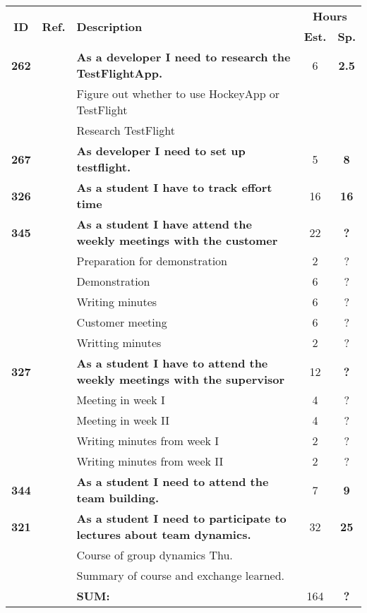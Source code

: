 \label{tab:sprint1storiesProcess}
\def\arraystretch{1.25}
 
\begin{longtable}{ccXcc}

\toprule[0.5mm]
\multirow{2}{*}{\textbf{ID}} &
\multirow{2}{*}{\textbf{Ref.}} & \multirow{2}{*}{\textbf{Description}} & \multicolumn{2}{c}{\textbf{Hours}} \\
 					& & & \textbf{Est.} & \textbf{Sp.} \\
\midrule

\textbf{262} 	&& {\bf As a developer I need to research the TestFlightApp. } 	& 		6	& \textbf{2.5} \\
				&& Figure out whether to use HockeyApp or TestFlight&  &  \\
				&& Research TestFlight	&  &  \\
\textbf{267} 	&& {\bf As developer I need to set up testflight. } 	& 		5	& \textbf{8} \\
\textbf{326} 	& 
	& {\bf  As a student I have to track effort time} 	& 		16	& \textbf{16} \\
\textbf{345} 	& 
	& {\bf As a student I have attend the weekly meetings with the customer} 	
	& 	22	
	& \textbf{?} \\
		&& Preparation for demonstration	& 2 & ? \\
		&& Demonstration	& 6 & ? \\
		&& Writing minutes 	&  6 & ? \\	
		&& Customer meeting	&  6 & ? \\
		&& Writting minutes	&  2 & ? \\
		
\textbf{327} 	& 
	& {\bf As a student I have to attend the weekly meetings with the supervisor} 	
	& 	12	
	& \textbf{?} \\
		&& Meeting in week I	& 4 & ? \\
		&& Meeting in week II	& 4 & ? \\
		&& Writing minutes from week I 	&  2 & ? \\
		&& Writing minutes from week II	&  2 & ? \\	

\textbf{344} 	&& {\bf As a student I need to attend the team building.} 	& 		7	& \textbf{9} \\
		

\textbf{321} 	&& {\bf As a student I need to participate to lectures about team dynamics. } 	& 		32	& \textbf{25} \\
				&& Course of group dynamics Thu.	&  &  \\
				&& Summary of course and exchange learned.	&  &  \\				
				
\hline
				&& \textbf{SUM:}		&		164	& \textbf{?}
 \\																			
\bottomrule[0.5mm]
\end{longtable}
